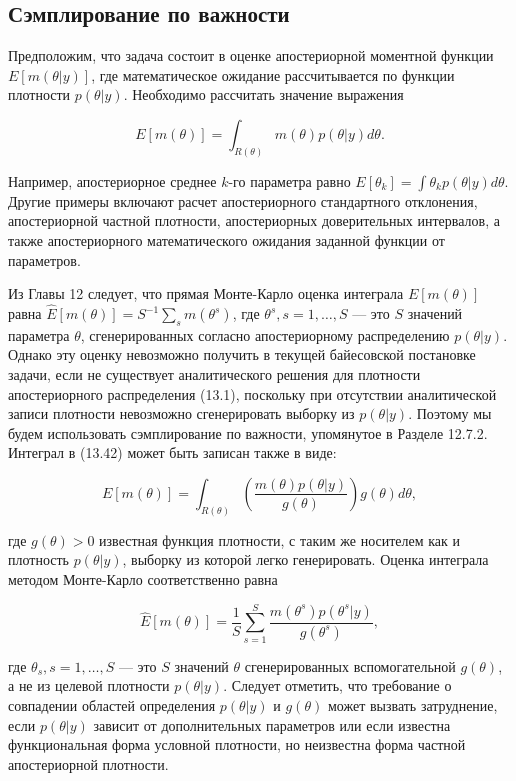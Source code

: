 \subsection{Сэмплирование по важности}

Предположим, что задача состоит в оценке апостериорной  моментной функции $E[m(\theta|y)]$, где математическое ожидание рассчитывается по функции плотности $p(\theta|y)$. Необходимо рассчитать значение выражения

\begin{equation}
E[m(\theta)]=\int_{R(\theta)}m(\theta)p(\theta|y)d\theta.
\end{equation}

Например, апостериорное среднее $k$-го параметра  равно $E[\theta_k]=\int{\theta_{k}}p(\theta|y)d\theta$. Другие примеры включают  расчет апостериорного стандартного отклонения,  апостериорной частной плотности, апостериорных доверительных интервалов, а также апостериорного математического ожидания заданной функции от параметров.


Из Главы 12 следует, что прямая Монте-Карло оценка интеграла $E[m(\theta)]$ равна $\hat{E}[m(\theta)]=S^{-1}\sum_{s}m(\theta^s)$, где $\theta^s, s=1,\ldots ,S$ --- это $S$ значений параметра $\theta$, сгенерированных согласно  апостериорному распределению $p(\theta|y)$. Однако эту оценку невозможно получить в текущей байесовской постановке задачи, если не существует аналитического решения для плотности апостериорного распределения (13.1), поскольку при отсутствии аналитической записи плотности невозможно сгенерировать выборку из $p(\theta|y)$. Поэтому мы будем использовать сэмплирование по важности, упомянутое в Разделе 12.7.2. Интеграл в (13.42) может быть записан также в виде:

\begin{equation}
E[m(\theta)]=\int_{R(\theta)}\left(\dfrac{m(\theta)p(\theta|y)}{g(\theta)}\right)g(\theta)d\theta, 
\end{equation}

где $g(\theta)>0$ известная функция плотности, с таким же носителем как и плотность $p(\theta|y)$, выборку из которой легко генерировать. Оценка интеграла методом Монте-Карло соответственно равна

\[
\hat{E}[m(\theta)]=\dfrac{1}{S}\sum^S_{s=1}\dfrac{m(\theta^s)p(\theta^s|y)}{g(\theta^s)},
\]

где $\theta_s, s=1,\ldots ,S$ --- это $S$ значений $\theta$ сгенерированных вспомогательной  $g(\theta)$, а не из целевой плотности $p(\theta|y)$. Следует отметить, что требование о совпадении областей определения $p(\theta|y)$ и $g(\theta)$ может вызвать затруднение, если $p(\theta|y)$ зависит от дополнительных параметров или если известна функциональная форма условной плотности, но неизвестна форма частной апостериорной плотности.

